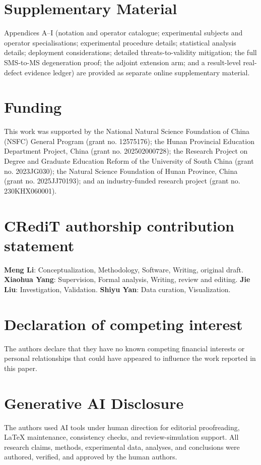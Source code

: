 \documentclass[acmsmall,screen,review]{acmart}
\begin{document}


\section*{Supplementary Material}

Appendices A--I (notation and operator catalogue; experimental subjects and
operator specialisations; experimental procedure details; statistical analysis
details; deployment considerations; detailed threats-to-validity mitigation;
the full SMS-to-MS degeneration proof; the adjoint extension arm; and a
result-level real-defect evidence ledger) are provided as separate online
supplementary material.

\section*{Funding}

This work was supported by the National Natural Science Foundation of China
(NSFC) General Program (grant no. 12575176); the Hunan Provincial Education
Department Project, China (grant no. 202502000728); the Research Project on
Degree and Graduate Education Reform of the University of South China (grant
no. 2023JG030); the Natural Science Foundation of Hunan Province, China (grant
no. 2025JJ70193); and an industry-funded research project (grant no.
230KHX060001).

\section*{CRediT authorship contribution statement}

\textbf{Meng Li}: Conceptualization, Methodology, Software, Writing, original
draft. \textbf{Xiaohua Yang}: Supervision, Formal analysis, Writing, review
and editing. \textbf{Jie Liu}: Investigation, Validation. \textbf{Shiyu Yan}:
Data curation, Visualization.

\section*{Declaration of competing interest}

The authors declare that they have no known competing financial interests or
personal relationships that could have appeared to influence the work reported
in this paper.

\section*{Generative AI Disclosure}

The authors used AI tools under human direction for editorial proofreading,
LaTeX maintenance, consistency checks, and review-simulation support. All
research claims, methods, experimental data, analyses, and conclusions were
authored, verified, and approved by the human authors.



\end{document}
